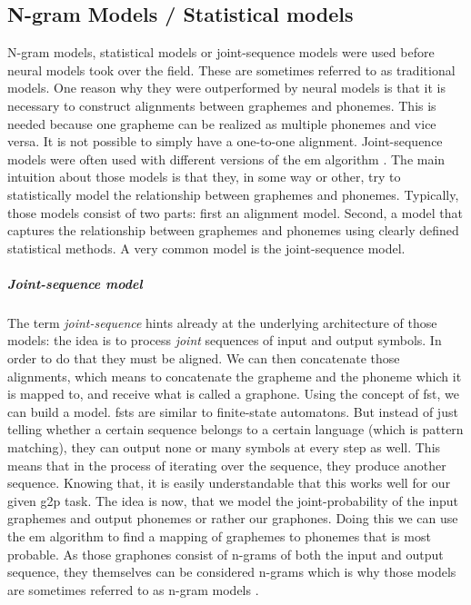 \subsection{N-gram Models / Statistical models}
N-gram models, statistical models or joint-sequence models were used before neural models took over the field. These are sometimes referred to as traditional models. One reason why they were outperformed by neural models is that it is necessary to construct alignments between graphemes and phonemes. This is needed because one grapheme can be realized as multiple phonemes and vice versa. It is not possible to simply have a one-to-one alignment. Joint-sequence models were often used with different versions of the \acf{em} algorithm \citep{lo-nicolai-2021-linguistic}. The main intuition about those models is that they, in some way or other, try to statistically model the relationship between graphemes and phonemes. Typically, those models consist of two parts: first an alignment model. Second, a model that captures the relationship between graphemes and phonemes using clearly defined statistical methods. A very common model is the joint-sequence model.

\subparagraph{Joint-sequence model} The term \textit{joint-sequence} hints already at the underlying architecture of those models: the idea is to process \textit{joint} sequences of input and output symbols. In order to do that they must be aligned. We can then concatenate those alignments, which means to concatenate the grapheme and the phoneme which it is mapped to, and receive what is called a graphone. Using the concept of \ac{fst}, we can build a model. \acp{fst} are similar to finite-state automatons. But instead of just telling whether a certain sequence belongs to a certain language (which is pattern matching), they can output none or many symbols at every step as well. This means that in the process of iterating over the sequence, they produce another sequence. Knowing that, it is easily understandable that this works well for our given \ac{g2p} task. The idea is now, that we model the joint-probability of the input graphemes and output phonemes or rather our graphones. Doing this we can use the \ac{em} algorithm to find a mapping of graphemes to phonemes that is most probable. As those graphones consist of n-grams of both the input and output sequence, they themselves can be considered n-grams which is why those models are sometimes referred to as n-gram models \citep{ney-joint-sequence2008, lo-nicolai-2021-linguistic}.

